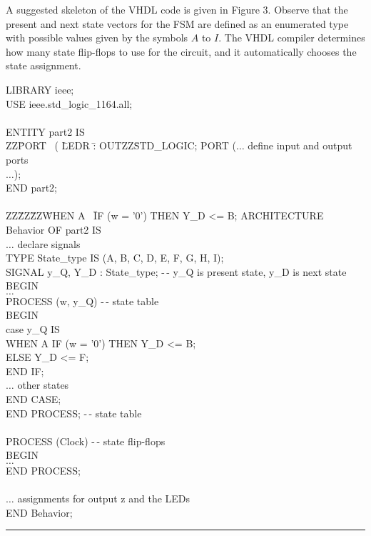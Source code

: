 \documentclass[epsfig,10pt,fullpage]{article}
\begin{document}
\noindent
A suggested skeleton of the VHDL code is given in Figure 3. Observe that the present and next
state vectors for the FSM are defined as an enumerated type with possible values given by
the symbols $A$ to $I$. The VHDL compiler determines how many state flip-flops to use for
the circuit, and it automatically chooses the state assignment.

\begin{center}
\begin{minipage}[t]{12.5 cm}
\begin{tabbing}
LIBRARY ieee;\\
USE ieee.std\_logic\_1164.all;\\
~\\
ENTITY part2 IS\\
ZZ\=PORT ~( \=LEDR \=: OUTZZ\=STD\_LOGIC;\kill
\>PORT (\>$\ldots$ define input and output ports\\
\>\>$\ldots$);\\
END part2;\\
~\\
ZZ\=ZZ\=ZZ\=WHEN A ~\=IF (w = '0') THEN Y\_D <= B;\kill
ARCHITECTURE Behavior OF part2 IS\\
\>$\ldots$ declare signals\\
\>TYPE State\_type IS (A, B, C, D, E, F, G, H, I);\\
\>SIGNAL y\_Q, Y\_D : State\_type; -$\,$- y\_Q is present state, y\_D is next state\\
BEGIN\\
\>$\ldots$ \\
\>PROCESS (w, y\_Q) -$\,$- state table\\
\>BEGIN\\
\>\>case y\_Q IS\\
\>\>\>WHEN A \>IF (w = '0') THEN Y\_D <= B;\\
\>\>\>\>ELSE Y\_D <= F;\\
\>\>\>\>END IF;\\
\>\>\>$\ldots$ other states\\
\>\>END CASE;\\
\>END PROCESS; -$\,$- state table\\
~\\
\>PROCESS (Clock) -$\,$- state flip-flops\\
\>BEGIN\\
\>\>$\ldots$ \\
\>END PROCESS;\\
~\\
\>$\ldots$ assignments for output z and the LEDs\\
END Behavior;
~\rule{5.0in}{0in}\\
\end{tabbing}
\end{minipage}
\end{center}
\end{document}
